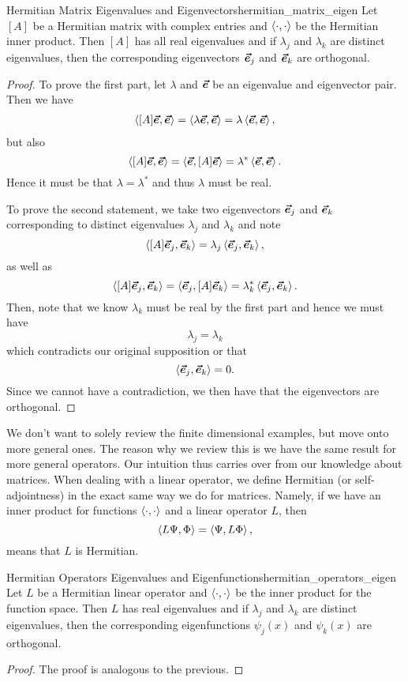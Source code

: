 \begin{thm}{Hermitian Matrix Eigenvalues and Eigenvectors}{hermitian_matrix_eigen}
Let $[A]$ be a Hermitian matrix with complex entries and $\left\langle \cdot, \cdot \right\rangle$ be the Hermitian inner product. Then $[A]$ has all real eigenvalues and if $\lambda_j$ and $\lambda_k$ are distinct eigenvalues, then the corresponding eigenvectors $\boldsymbol{\vec{e}}_j$ and $\boldsymbol{\vec{e}}_k$ are orthogonal.
\tcblower
\begin{proof}
To prove the first part, let $\lambda$ and $\boldsymbol{\vec{e}}$ be an eigenvalue and eigenvector pair.  Then we have
\begin{align*}
	\left\langle [A]\boldsymbol{\vec{e}}, \boldsymbol{\vec{e}} \right\rangle=\left\langle \lambda\boldsymbol{\vec{e}}, \boldsymbol{\vec{e}} \right\rangle=\lambda\left\langle \boldsymbol{\vec{e}}, \boldsymbol{\vec{e}} \right\rangle,
\end{align*}
but also
\[
\left\langle [A]\boldsymbol{\vec{e}}, \boldsymbol{\vec{e}} \right\rangle = \left\langle \boldsymbol{\vec{e}}, [A]\boldsymbol{\vec{e}} \right\rangle=\lambda^* \left\langle \boldsymbol{\vec{e}}, \boldsymbol{\vec{e}} \right\rangle.
\]
Hence it must be that $\lambda=\lambda^*$ and thus $\lambda$ must be real.

To prove the second statement, we take two eigenvectors $\boldsymbol{\vec{e}}_j$ and $\boldsymbol{\vec{e}}_k$ corresponding to distinct eigenvalues $\lambda_j$ and $\lambda_k$ and note
\[
\left\langle [A]\boldsymbol{\vec{e}}_j, \boldsymbol{\vec{e}}_k \right\rangle = \lambda_j \left\langle \boldsymbol{\vec{e}}_j, \boldsymbol{\vec{e}}_k \right\rangle,
\]
as well as
\[
\left\langle [A]\boldsymbol{\vec{e}}_j, \boldsymbol{\vec{e}}_k \right\rangle=\left\langle \boldsymbol{\vec{e}}_j, [A]\boldsymbol{\vec{e}}_k \right\rangle=\lambda_k^* \left\langle \boldsymbol{\vec{e}}_j, \boldsymbol{\vec{e}}_k \right\rangle.
\]
Then, note that we know $\lambda_k$ must be real by the first part and hence we must have
\[
\lambda_j=\lambda_k
\]
which contradicts our original supposition or that
\[
\left\langle \boldsymbol{\vec{e}}_j, \boldsymbol{\vec{e}}_k \right\rangle=0.
\]
Since we cannot have a contradiction, we then have that the eigenvectors are orthogonal.
\end{proof}
\end{thm}

We don't want to solely review the finite dimensional examples, but move onto more general ones.  The reason why we review this is we have the same result for more general operators. Our intuition thus carries over from our knowledge about matrices. When dealing with a linear operator, we define Hermitian (or self-adjointness) in the exact same way we do for matrices.  Namely, if we have an inner product for functions $\left\langle \cdot, \cdot \right\rangle$ and a linear operator $L$, then
\[
\left\langle L\Psi, \Phi \right\rangle = \left\langle \Psi, L\Phi \right\rangle,
\]
means that $L$ is Hermitian.  

\begin{thm}{Hermitian Operators Eigenvalues and Eigenfunctions}{hermitian_operators_eigen}
	Let $L$ be a Hermitian linear operator and $\left\langle \cdot, \cdot \right\rangle$ be the inner product for the function space. Then $L$ has real eigenvalues and if $\lambda_j$ and $\lambda_k$ are distinct eigenvalues, then the corresponding eigenfunctions $\psi_j(x)$ and $\psi_k(x)$ are orthogonal.
	\tcblower
	\begin{proof}
		The proof is analogous to the previous.
	\end{proof}
\end{thm} 

